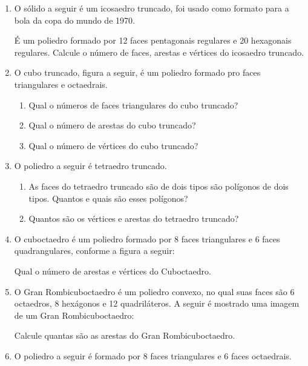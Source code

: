 \documentclass[twocolumn,oneside,a4paper,12pt]{article}
\begin{document}
\begin{enumerate}
\item O sólido a seguir é um icosaedro truncado, foi usado como formato para a bola da copa do mundo de 1970.


É um poliedro formado por 12 faces pentagonais regulares e 20 hexagonais regulares. Calcule o número de faces, arestas e vértices do icosaedro truncado.

\item O cubo truncado, figura a seguir, é um poliedro formado pro faces triangulares e octaedrais.

\begin{enumerate}
\item Qual o números de faces triangulares do cubo truncado?
\item Qual o número de arestas do cubo truncado?
\item Qual o número de vértices do cubo truncado?
\end{enumerate}

\item O poliedro a seguir é tetraedro truncado.

\begin{enumerate}
\item As faces do tetraedro truncado são de dois tipos são polígonos de dois tipos. Quantos e quais são esses polígonos?
\item Quantos são os vértices e arestas do tetraedro truncado?
\end{enumerate}

\item O cuboctaedro é um poliedro formado por 8 faces triangulares e 6 faces quadrangulares, conforme a figura a seguir:

Qual o número de arestas e vértices do Cuboctaedro.

\item O Gran Rombicuboctaedro é um poliedro convexo, no qual suas faces são 6 octaedros, 8 hexágonos e 12 quadriláteros. A seguir é mostrado uma imagem de um Gran Rombicuboctaedro:


Calcule quantas são as arestas do Gran Rombicuboctaedro.

\item O poliedro a seguir é formado por 8 faces triangulares e 6 faces octaedrais.


\end{enumerate}
\end{document}
